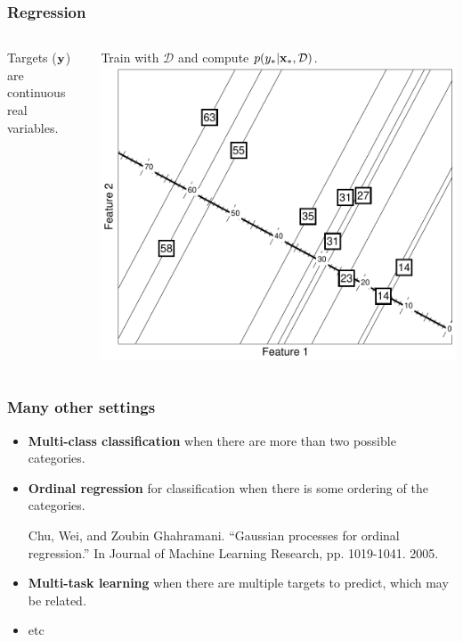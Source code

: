 \begin{frame}
\frametitle{Regression}
\begin{columns}
Targets (${\bf y}$) are continuous real variables.\par
Train with $\mathcal{D}$ and compute $p(y_* | {\bf x}_*, \mathcal{D})$.
\includegraphics[width=\textwidth]{regression}
\end{columns}
\end{frame}

\begin{frame}
\frametitle{Many other settings}
\begin{itemize}
\item {\bf Multi-class classification} when there are more than two possible categories.
\item {\bf Ordinal regression} for classification when there is some ordering of the categories.\par
\begin{tiny}
Chu, Wei, and Zoubin Ghahramani. ``Gaussian processes for ordinal regression.'' In Journal of Machine Learning Research, pp. 1019-1041. 2005.\par
\end{tiny}
\item {\bf Multi-task learning} when there are multiple targets to predict, which may be related.
\item etc
\end{itemize}
\end{frame}

